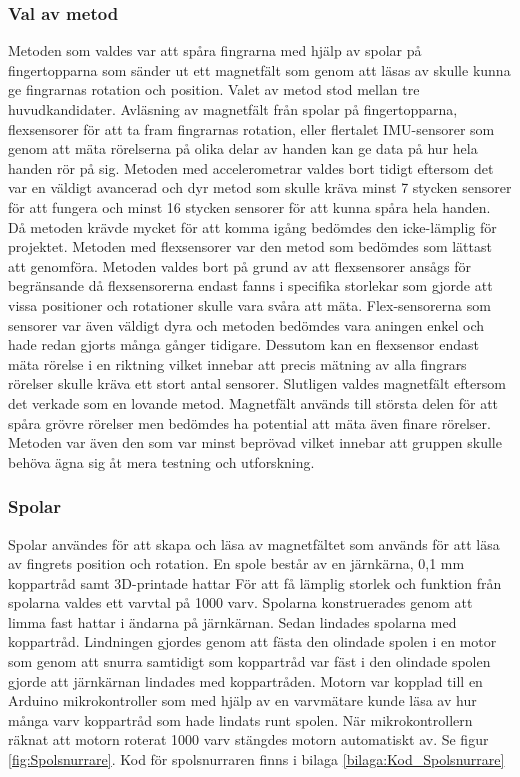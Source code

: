 \documentclass[a4paper]{article}
\begin{document}
\begin{sloppypar}
  \subsubsection{Val av metod}
  Metoden som valdes var att spåra fingrarna med hjälp av spolar på fingertopparna som
  sänder ut ett magnetfält som genom att läsas av skulle kunna ge fingrarnas rotation
  och position. Valet av metod stod mellan tre huvudkandidater. Avläsning av magnetfält
  från spolar på fingertopparna, flexsensorer för att ta fram fingrarnas rotation, eller
  flertalet IMU-sensorer som genom att mäta rörelserna på olika delar av handen kan
  ge data på hur hela handen rör på sig.
  Metoden med accelerometrar valdes bort tidigt eftersom det var en väldigt avancerad och
  dyr metod som skulle kräva minst 7 stycken sensorer för att fungera och minst 16 stycken
  sensorer för att kunna spåra hela handen. Då metoden krävde mycket för att komma
  igång bedömdes den icke-lämplig för projektet.
  Metoden med flexsensorer var den metod som bedömdes som lättast att genomföra. Metoden
  valdes bort på grund av att flexsensorer ansågs för begränsande då flexsensorerna
  endast fanns i specifika storlekar som gjorde att vissa positioner och rotationer
  skulle vara svåra att mäta. Flex-sensorerna som sensorer var även väldigt dyra och
  metoden bedömdes vara aningen enkel och hade redan gjorts många gånger tidigare.
  Dessutom kan en flexsensor endast mäta rörelse i en riktning vilket innebar att
  precis mätning av alla fingrars rörelser skulle kräva ett stort antal sensorer.
  Slutligen valdes magnetfält eftersom det verkade som en lovande metod. Magnetfält
  används till största delen för att spåra grövre rörelser men bedömdes ha potential
  att mäta även finare rörelser. Metoden var även den som var minst beprövad vilket
  innebar att gruppen skulle behöva ägna sig åt mera testning och utforskning.




  \subsubsection{Spolar}
  Spolar användes för att skapa och läsa av magnetfältet som används för att läsa av fingrets position och rotation.
  En spole består av en järnkärna, 0,1 mm koppartråd samt 3D-printade hattar
  För att få lämplig storlek och funktion från spolarna valdes ett varvtal på 1000 varv.
  Spolarna konstruerades genom att limma fast hattar i ändarna på järnkärnan.
  Sedan lindades spolarna med koppartråd.
  Lindningen gjordes genom att fästa den olindade spolen i en motor som genom att snurra samtidigt som koppartråd
  var fäst i den olindade spolen gjorde att järnkärnan lindades med koppartråden.
  Motorn var kopplad till en Arduino mikrokontroller som med hjälp av en varvmätare kunde läsa av hur många varv
  koppartråd som hade lindats runt spolen.
  När mikrokontrollern räknat att motorn roterat 1000 varv stängdes motorn automatiskt av. Se figur \ref{fig:Spolsnurrare}.
  Kod för spolsnurraren finns i bilaga \ref{bilaga:Kod_Spolsnurrare}


\end{sloppypar}
\end{document}
